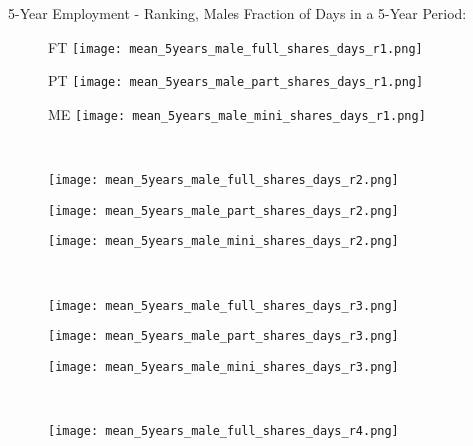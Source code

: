 \documentclass[hyperref={bookmarks=false}]{beamer}
\begin{document}
\begin{appendix}
\begin{frame}{5-Year Employment - Ranking, Males}
Fraction of Days in a 5-Year Period:
\begin{figure}[!t]
\begin{minipage}[b]{0.15\textwidth}{FT}
\centering
\texttt{[image: mean\_5years\_male\_full\_shares\_days\_r1.png]}
\end{minipage}
\begin{minipage}[b]{0.15\textwidth}{PT}
\centering
\texttt{[image: mean\_5years\_male\_part\_shares\_days\_r1.png]}
\end{minipage}
\begin{minipage}[b]{0.15\textwidth}{ME}
\centering
\texttt{[image: mean\_5years\_male\_mini\_shares\_days\_r1.png]}
\end{minipage}\\
\begin{minipage}[b]{0.15\textwidth}{}
\centering
\texttt{[image: mean\_5years\_male\_full\_shares\_days\_r2.png]}
\end{minipage}
\begin{minipage}[b]{0.15\textwidth}{}
\centering
\texttt{[image: mean\_5years\_male\_part\_shares\_days\_r2.png]}
\end{minipage}
\begin{minipage}[b]{0.15\textwidth}{}
\centering
\texttt{[image: mean\_5years\_male\_mini\_shares\_days\_r2.png]}
\end{minipage}\\
\begin{minipage}[b]{0.15\textwidth}{}
\centering
\texttt{[image: mean\_5years\_male\_full\_shares\_days\_r3.png]}
\end{minipage}
\begin{minipage}[b]{0.15\textwidth}{}
\centering
\texttt{[image: mean\_5years\_male\_part\_shares\_days\_r3.png]}
\end{minipage}
\begin{minipage}[b]{0.15\textwidth}{}
\centering
\texttt{[image: mean\_5years\_male\_mini\_shares\_days\_r3.png]}
\end{minipage}\\
\begin{minipage}[b]{0.15\textwidth}{}
\centering
\texttt{[image: mean\_5years\_male\_full\_shares\_days\_r4.png]}
\end{minipage}
\begin{minipage}[b]{0.15\textwidth}{}

\end{minipage}
\end{figure}
\end{frame}
\end{appendix}
\end{document}
